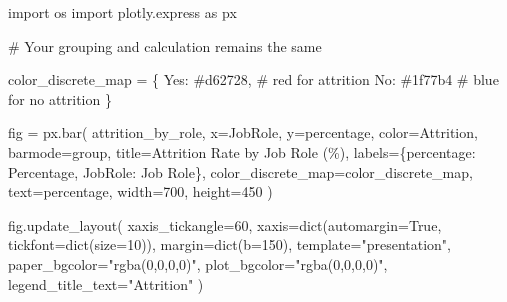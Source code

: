 \documentclass[
  letterpaper,
  DIV=11,
  numbers=noendperiod]{scrartcl}
\newenvironment{Shaded}{\begin{snugshade}}{\end{snugshade}}
\newcommand{\BuiltInTok}[1]{\textcolor[rgb]{0.00,0.23,0.31}{#1}}
\newcommand{\CommentTok}[1]{\textcolor[rgb]{0.37,0.37,0.37}{#1}}
\newcommand{\DecValTok}[1]{\textcolor[rgb]{0.68,0.00,0.00}{#1}}
\newcommand{\ImportTok}[1]{\textcolor[rgb]{0.00,0.46,0.62}{#1}}
\newcommand{\NormalTok}[1]{\textcolor[rgb]{0.00,0.23,0.31}{#1}}
\newcommand{\OperatorTok}[1]{\textcolor[rgb]{0.37,0.37,0.37}{#1}}
\newcommand{\StringTok}[1]{\textcolor[rgb]{0.13,0.47,0.30}{#1}}
\newcommand{\VariableTok}[1]{\textcolor[rgb]{0.07,0.07,0.07}{#1}}
\begin{document}
\begin{Shaded}
\begin{Highlighting}[]
\ImportTok{import}\NormalTok{ os}
\ImportTok{import}\NormalTok{ plotly.express }\ImportTok{as}\NormalTok{ px}

\CommentTok{\# Your grouping and calculation remains the same}

\NormalTok{color\_discrete\_map }\OperatorTok{=}\NormalTok{ \{}
    \StringTok{\textquotesingle{}Yes\textquotesingle{}}\NormalTok{: }\StringTok{\textquotesingle{}\#d62728\textquotesingle{}}\NormalTok{,  }\CommentTok{\# red for attrition}
    \StringTok{\textquotesingle{}No\textquotesingle{}}\NormalTok{: }\StringTok{\textquotesingle{}\#1f77b4\textquotesingle{}}    \CommentTok{\# blue for no attrition}
\NormalTok{\}}

\NormalTok{fig }\OperatorTok{=}\NormalTok{ px.bar(}
\NormalTok{    attrition\_by\_role,}
\NormalTok{    x}\OperatorTok{=}\StringTok{\textquotesingle{}JobRole\textquotesingle{}}\NormalTok{,}
\NormalTok{    y}\OperatorTok{=}\StringTok{\textquotesingle{}percentage\textquotesingle{}}\NormalTok{,}
\NormalTok{    color}\OperatorTok{=}\StringTok{\textquotesingle{}Attrition\textquotesingle{}}\NormalTok{,}
\NormalTok{    barmode}\OperatorTok{=}\StringTok{\textquotesingle{}group\textquotesingle{}}\NormalTok{,}
\NormalTok{    title}\OperatorTok{=}\StringTok{\textquotesingle{}Attrition Rate by Job Role (\%)\textquotesingle{}}\NormalTok{,}
\NormalTok{    labels}\OperatorTok{=}\NormalTok{\{}\StringTok{\textquotesingle{}percentage\textquotesingle{}}\NormalTok{: }\StringTok{\textquotesingle{}Percentage\textquotesingle{}}\NormalTok{, }\StringTok{\textquotesingle{}JobRole\textquotesingle{}}\NormalTok{: }\StringTok{\textquotesingle{}Job Role\textquotesingle{}}\NormalTok{\},}
\NormalTok{    color\_discrete\_map}\OperatorTok{=}\NormalTok{color\_discrete\_map,}
\NormalTok{    text}\OperatorTok{=}\StringTok{\textquotesingle{}percentage\textquotesingle{}}\NormalTok{,}
\NormalTok{    width}\OperatorTok{=}\DecValTok{700}\NormalTok{,}
\NormalTok{    height}\OperatorTok{=}\DecValTok{450}
\NormalTok{)}

\NormalTok{fig.update\_layout(}
\NormalTok{    xaxis\_tickangle}\OperatorTok{=}\DecValTok{60}\NormalTok{,}
\NormalTok{    xaxis}\OperatorTok{=}\BuiltInTok{dict}\NormalTok{(automargin}\OperatorTok{=}\VariableTok{True}\NormalTok{, tickfont}\OperatorTok{=}\BuiltInTok{dict}\NormalTok{(size}\OperatorTok{=}\DecValTok{10}\NormalTok{)),}
\NormalTok{    margin}\OperatorTok{=}\BuiltInTok{dict}\NormalTok{(b}\OperatorTok{=}\DecValTok{150}\NormalTok{),}
\NormalTok{    template}\OperatorTok{=}\StringTok{"presentation"}\NormalTok{,}
\NormalTok{    paper\_bgcolor}\OperatorTok{=}\StringTok{"rgba(0,0,0,0)"}\NormalTok{,}
\NormalTok{    plot\_bgcolor}\OperatorTok{=}\StringTok{"rgba(0,0,0,0)"}\NormalTok{,}
\NormalTok{    legend\_title\_text}\OperatorTok{=}\StringTok{"Attrition"}
\NormalTok{)}


\end{Highlighting}
\end{Shaded}
\end{document}
